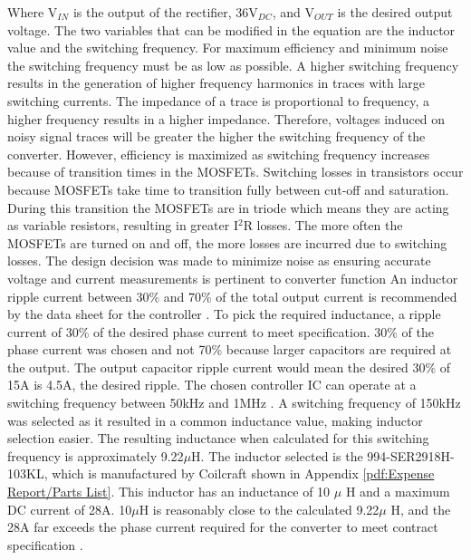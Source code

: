 \documentclass[11pt]{article}
\begin{document}
    \noindent Where V$_{IN}$ is the output of the rectifier, 36V$_{DC}$, and V$_{OUT}$ is the desired output voltage. The two variables that can be modified in the equation are the inductor value and the switching frequency. For maximum efficiency and minimum noise the switching frequency must be as low as possible. A higher switching frequency results in the generation of higher frequency harmonics in traces with large switching currents. The impedance of a trace is proportional to frequency, a higher frequency results in a higher impedance. Therefore, voltages induced on noisy signal traces will be greater the higher the switching frequency of the converter. However, efficiency is maximized as switching frequency increases because of transition times in the MOSFETs. Switching losses in transistors occur because MOSFETs take time to transition fully between cut-off and saturation. During this transition the MOSFETs are in triode which means they are acting as variable resistors, resulting in greater I$^2$R losses. The more often the MOSFETs are turned on and off, the more losses are incurred due to switching losses. The design decision was made to minimize noise as ensuring accurate voltage and current measurements is pertinent to converter function
    \newline
    \newline
    \noindent An inductor ripple current between 30\% and 70\% of the total output current is recommended by the data sheet for the controller \cite{linear_technology_ltc3892:_nodate}. To pick the required inductance, a ripple current of 30\% of the desired phase current to meet specification. 30\% of the phase current was chosen and not 70\% because larger capacitors are required at the output. The output capacitor ripple current would mean the desired 30\% of 15A is 4.5A, the desired ripple. The chosen controller IC can operate at a switching frequency between 50kHz and 1MHz \cite{linear_technology_ltc3892:_nodate}. A switching frequency of 150kHz was selected as it resulted in a common inductance value, making inductor selection easier. The resulting inductance when calculated for this switching frequency is approximately 9.22$\mu$H. The inductor selected is the 994-SER2918H-103KL, which is manufactured by Coilcraft shown in Appendix \ref{pdf:Expense Report/Parts List}. This inductor has an inductance of 10 $\mu$ H and a maximum DC current of 28A. 10$\mu$H is reasonably close to the calculated 9.22$\mu$ H, and the 28A far exceeds the phase current required for the converter to meet contract specification \cite{noauthor_shielded_2017}.
\end{document}
